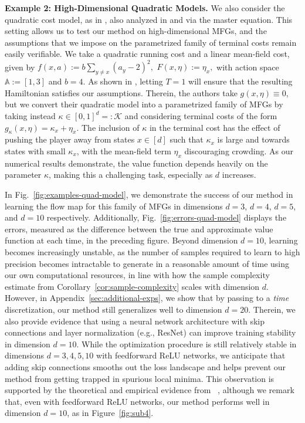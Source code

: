 \documentclass[11pt,reqno]{amsart}
\numberwithin{equation}{section}
\theoremstyle{plain}
\newcommand{\calK}{{\mathcal K}}
\newcommand{\A}{\mathbb{A}}
\newcommand{\1}{\boldsymbol{\mathbbm{1}}}
\begin{document}
\noindent\textbf{Example 2: High-Dimensional Quadratic Models.}
We also consider the quadratic cost model, as in \cite[Section 7.1]{coh-lau-zel2025}, also analyzed in \cite[Example 1] {cec-pel2019} and \cite[Example 3.1]{bay-coh2019} via the master equation. This setting allows us to test our method on high-dimensional MFGs, and the assumptions that we impose on the parametrized family of terminal costs remain easily verifiable. We take a quadratic running cost and a linear mean-field cost, given by
$f(x, a) := b \sum_{y \neq x} (a_y - 2)^2,$ $F(x, \eta) := \eta_x,$
with action space $\A := [1, 3]$ and $b = 4$. As shown in \cite[Section 7.1]{coh-lau-zel2025}, letting $T = 1$ will ensure that the resulting Hamiltonian satisfies our assumptions. Therein, the authors take $g(x, \eta) \equiv 0$, but we convert their quadratic model into a parametrized family of MFGs by taking instead $\kappa \in [0,1]^d =: \calK$ and considering terminal costs of the form 
$
    g_\kappa(x, \eta) = \kappa_x + \eta_x.
$
The inclusion of $\kappa$ in the terminal cost has the effect of pushing the player away from states $x \in [d]$ such that $\kappa_x$ is large and towards states with small $\kappa_x$, with the mean-field term $\eta_x$ discouraging crowding. As our numerical results demonstrate, the value function depends heavily on the parameter $\kappa$, making this a challenging task, especially as $d$ increases.

In Fig.~\ref{fig:examples-quad-model}, we demonstrate the success of our method in learning the flow map for this family of MFGs in dimensions $d = 3$, $d = 4$, $d = 5$, and $d = 10$ respectively. Additionally, Fig.~\ref{fig:errors-quad-model} displays the errors, measured as the difference between the true and approximate value function at each time, in the preceding figure. Beyond dimension $d = 10$, learning becomes increasingly unstable, as the number of samples required to learn to high precision becomes intractable to generate in a reasonable amount of time using our own computational resources, in line with how the sample complexity estimate from Corollary~\ref{cor:sample-complexity} scales with dimension $d$. However, in Appendix~\ref{sec:additional-exps}, we show that by passing to a \textit{time} discretization, our method still generalizes well to dimension $d = 20$. Therein, we also provide evidence that using a neural network architecture with skip connections and layer normalization (e.g., ResNet) can improve training stability in dimension $d = 10$. While the optimization procedure is still relatively stable in dimensions $d = 3, 4, 5, 10$ with feedforward ReLU networks, we anticipate that adding skip connections smooths out the loss landscape and helps prevent our method from getting trapped in spurious local minima. This observation is supported by the theoretical and empirical evidence from ~\cite{balduzzi17b}, although we remark that, even with feedforward ReLU networks, our method performs well in dimension $d = 10$, as in Figure~\ref{fig:sub4}.
\end{document}
